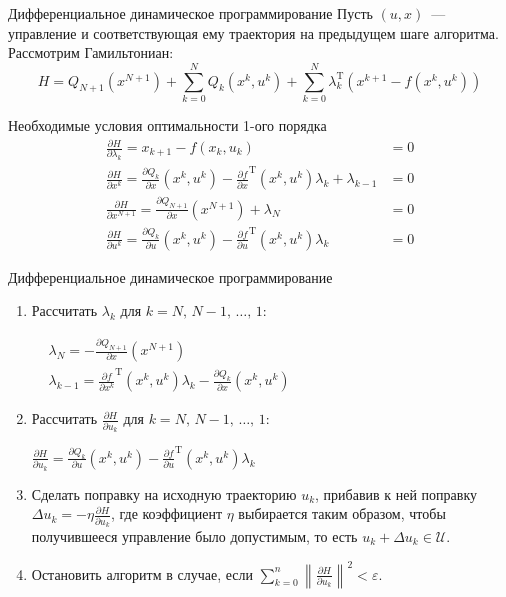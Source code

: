 \documentclass[16pt]{beamer}
\begin{document}
    \begin{frame}{Дифференциальное динамическое программирование}
        Пусть $(u, x)$~--- управление и соответствующая ему траектория на предыдущем шаге алгоритма. Рассмотрим Гамильтониан:
        $$
            H = Q_{N+1}(x^{N+1}) + \sum_{k=0}^N Q_k(x^k, u^k) + \sum_{k=0}^{N}\lambda_k^{\mathrm{T}}(x^{k+1} - f(x^k, u^k))
        $$
        \begin{block}{Необходимые условия оптимальности 1-ого порядка}
            \begin{align*}
                \frac{\partial H}{\partial \lambda_k} = x_{k+1} - f(x_k, u_k) &= 0 \\
                \frac{\partial H}{\partial x^k} = \frac{\partial Q_k}{\partial x}(x^k,u^k) - \frac{\partial f}{\partial x}^{\mathrm{T}}(x^k, u^k)\lambda_k + \lambda_{k-1} &= 0 \\
                \frac{\partial H}{\partial x^{N+1}} = \frac{\partial Q_{N+1}}{\partial x}(x^{N+1}) + \lambda_{N} &= 0 \\
                \frac{\partial H}{\partial u^k} = \frac{\partial Q_k}{\partial u}(x^k, u^k) - \frac{\partial f}{\partial u}^{\mathrm{T}}(x^k, u^k)\lambda_k &= 0
            \end{align*}
        \end{block}
    \end{frame}

    \begin{frame}{Дифференциальное динамическое программирование}
        \begin{enumerate}
            \item Рассчитать $\lambda_k$ для $k=N,\,N-1,\,\ldots,\,1$:
            
            $
                \begin{aligned}
                    &\lambda_N = - \frac{\partial Q_{N+1}}{\partial x}(x^{N+1})\\
                    &\lambda_{k-1} = \frac{\partial f}{\partial x^k}^{\mathrm{T}}(x^k, u^k)\lambda_k - \frac{\partial Q_k}{\partial x}(x^k, u^k)
                \end{aligned}
            $
            
            \item Рассчитать $\frac{\partial H}{\partial u_k}$ для $k=N,\,N-1,\,\ldots,\,1$:
            
            $
                \frac{\partial H}{\partial u_k} = \frac{\partial Q_k}{\partial u}(x^k, u^k) - \frac{\partial f}{\partial u}^{\mathrm{T}}(x^k, u^k)\lambda_k
            $

            \item Сделать поправку на исходную траекторию $u_k$, прибавив к ней поправку $\Delta u_k = -\eta\frac{\partial H}{\partial u_k}$,
            где коэффициент $\eta$ выбирается таким образом, чтобы получившееся управление было допустимым, то есть $u_k + \Delta u_k \in \mathcal{U}$.
            \item Остановить алгоритм в случае, если $\sum_{k=0}^n \left\| \frac{\partial H}{\partial u_k} \right\|^2 < \varepsilon$.
        \end{enumerate}
    \end{frame}
\end{document}
